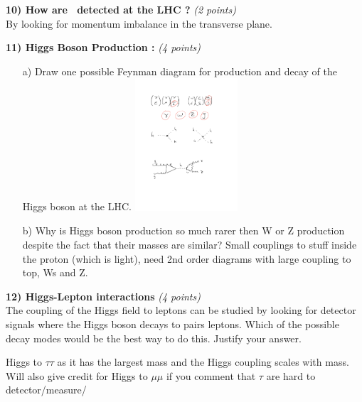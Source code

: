 {\vspace*{0.5in}


\textbf{10) How are \nus\ detected at the LHC ?} \hfill \textit{(2 points)}\\

\bc
By looking for momentum imbalance in the transverse plane.
\ec

\vspace*{0.5in}

\clearpage

\textbf{11) Higgs Boson Production : } \hfill \textit{(4 points)}\\
\begin{itemize}
\item[a)]{ Draw one possible Feynman diagram for production and decay of the Higgs boson at the LHC.}
\bc
\includegraphics[width=0.3\textwidth]{./ggHgamgam.pdf}
\ec

\item[b)]{ Why is Higgs boson production so much rarer then W or Z production despite the fact that their masses are similar?   
\bc
Small couplings to stuff inside the proton (which is light), need 2nd order diagrams with large coupling to top, Ws and Z.
\ec
 }
\end{itemize}

\vspace*{0.5in}


\textbf{12) Higgs-Lepton interactions } \hfill \textit{(4 points)}\\
The coupling of the Higgs field to leptons can be studied by looking for detector signals where the Higgs boson decays to pairs leptons.
Which of the possible decay modes would be the best way to do this.  Justify your answer.

\bc
Higgs to $\tau\tau$ as it has the largest mass and the Higgs coupling scales with mass. 
Will also give credit for Higgs to $\mu\mu$ if you comment that $\tau$ are hard to detector/measure/
\ec

\clearpage

}
